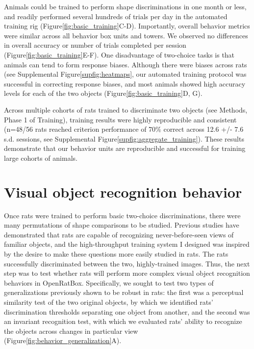Animals could be trained to perform shape discriminations in one month or less, and readily performed several hundreds of trials per day in the automated training rig (Figure\ref{fig:basic_training}C-D). Importantly, overall behavior metrics were similar across all behavior box units and towers. We observed no differences in overall accuracy or number of trials completed per session (Figure\ref{fig:basic_training}E-F). One disadvantage of two-choice tasks is that animals can tend to form response biases. Although there were biases across rats (see Supplemental Figure\ref{supfig:heatmaps}, our automated training protocol was successful in correcting response biases, and most animals showed high accuracy levels for each of the two objects (Figure\ref{fig:basic_training}D, G). 

Across multiple cohorts of rats trained to discriminate two objects (see Methods, Phase 1 of Training), training results were highly reproducible and consistent (n=48/56 rats reached criterion performance of 70\% correct across 12.6 +/- 7.6 s.d. sessions, see Supplemental Figure\ref{supfig:aggregate_training}). These results demonstrate that our behavior units are reproducible and successful for training large cohorts of animals. 

\section{Visual object recognition behavior}
Once rats were trained to perform basic two-choice discriminations, there were many permutations of shape comparisons to be studied. Previous studies have demonstrated that rats are capable of recognizing never-before-seen views of familiar objects\cite{Zoccolan2009, Vermaercke2012, Tafazoli2012}, and the high-throughput training system I designed was inspired by the desire to make these questions more easily studied in rats. The rats successfully discriminated between the two, highly-trained images. Thus, the next step was to test whether rats will perform more complex visual object recognition behaviors in OpenRatBox. Specifically, we sought to test two types of generalizations previously shown to be robust in rats\cite{Zoccolan2009, Tafazoli2012}: the first was a perceptual similarity test of the two original objects, by which we identified rats’ discrimination thresholds separating one object from another, and the second was an invariant recognition test, with which we evaluated rats' ability to recognize the objects across changes in particular view (Figure\ref{fig:behavior_generalization}A). 

